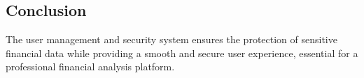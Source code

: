 \subsection{Conclusion}
The user management and security system ensures the protection of sensitive financial data while providing a smooth and secure user experience, essential for a professional financial analysis platform.




